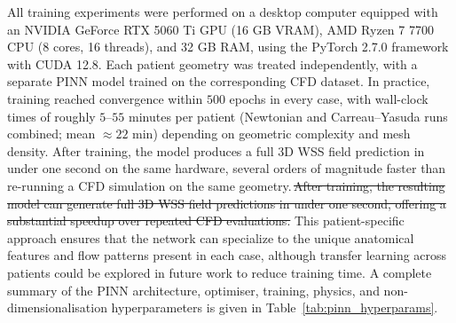 ﻿\documentclass[12pt,a4paper]{article}
\newcommand{\added}[2][]{\begingroup\color{red}#2\endgroup}
\newcommand{\deleted}[2][]{\begingroup\color{red}\sout{#2}\endgroup}
\newcommand{\replaced}[3][]{\added{#2}\,\deleted{#3}}
\newcommand{\addp}[1]{\added{#1}}
\theoremstyle{definition}
\numberwithin{equation}{section}
\begin{document}
{All training experiments were performed on a desktop computer equipped with an NVIDIA GeForce RTX 5060 Ti GPU (16 GB VRAM), AMD Ryzen 7 7700 CPU (8 cores, 16 threads), and 32 GB RAM, using the PyTorch 2.7.0 framework with CUDA 12.8. Each patient geometry was treated independently, with a separate PINN model trained on the corresponding CFD dataset. \addp{In practice, training reached convergence within $500$ epochs in every case, with wall-clock times of roughly $5$--$55$ minutes per patient (Newtonian and Carreau--Yasuda runs combined; mean $\approx 22$ min) depending on geometric complexity and mesh density.} \replaced[id=pinn]{After training, the model produces a full 3D WSS field prediction in under one second on the same hardware, several orders of magnitude faster than re-running a CFD simulation on the same geometry.}{After training, the resulting model can generate full 3D WSS field predictions in under one second, offering a substantial speedup over repeated CFD evaluations.} This patient-specific approach ensures that the network can specialize to the unique anatomical features and flow patterns present in each case, although transfer learning across patients could be explored in future work to reduce training time. \addp{A complete summary of the PINN architecture, optimiser, training, physics, and non-dimensionalisation hyperparameters is given in Table~\ref{tab:pinn_hyperparams}.}
}
\end{document}
